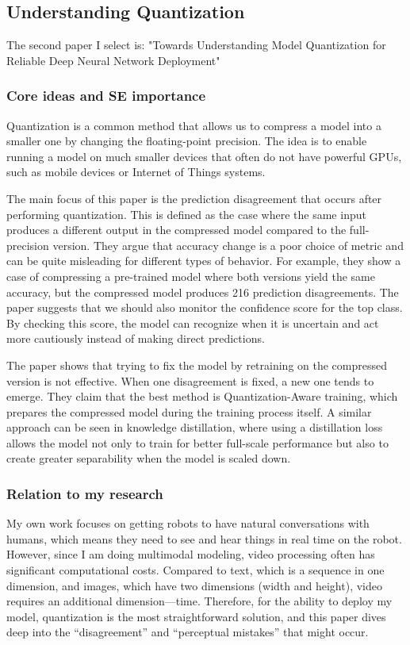 \documentclass[11pt]{article}
\begin{document}
\subsection{Understanding Quantization}
The second paper I select is: "Towards Understanding Model Quantization for
Reliable Deep Neural Network Deployment\cite{quan}"
\subsubsection{Core ideas and SE importance}
Quantization is a common method that allows us to compress a model into a smaller one by changing the floating-point precision. The idea is to enable running a model on much smaller devices that often do not have powerful GPUs, such as mobile devices or Internet of Things systems.

The main focus of this paper is the prediction disagreement that occurs after performing quantization. This is defined as the case where the same input produces a different output in the compressed model compared to the full-precision version. They argue that accuracy change is a poor choice of metric and can be quite misleading for different types of behavior. For example, they show a case of compressing a pre-trained model where both versions yield the same accuracy, but the compressed model produces 216 prediction disagreements. The paper suggests that we should also monitor the confidence score for the top class. By checking this score, the model can recognize when it is uncertain and act more cautiously instead of making direct predictions. 

The paper shows that trying to fix the model by retraining on the compressed version is not effective. When one disagreement is fixed, a new one tends to emerge. They claim that the best method is Quantization-Aware training, which prepares the compressed model during the training process itself. A similar approach can be seen in knowledge distillation, where using a distillation loss allows the model not only to train for better full-scale performance but also to create greater separability when the model is scaled down.

\subsubsection{Relation to my research}
My own work focuses on getting robots to have natural conversations with humans, which means they need to see and hear things in real time on the robot. However, since I am doing multimodal modeling, video processing often has significant computational costs. Compared to text, which is a sequence in one dimension, and images, which have two dimensions (width and height), video requires an additional dimension—time. Therefore, for the ability to deploy my model, quantization is the most straightforward solution, and this paper dives deep into the “disagreement” and “perceptual mistakes” that might occur.
\end{document}
